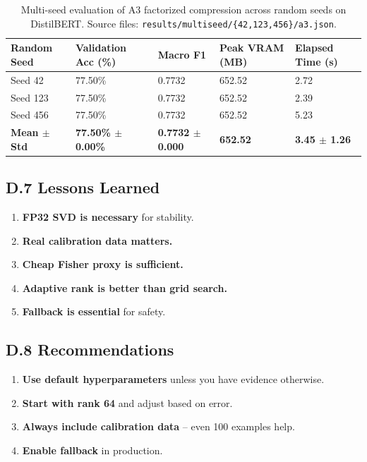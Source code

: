 \begin{table}[H]
\centering
\small
\begin{tabular}{lllll}
\toprule
\textbf{Random Seed} & \textbf{Validation Acc (\%)} & \textbf{Macro F1} & \textbf{Peak VRAM (MB)} & \textbf{Elapsed Time (s)} \\
\midrule
Seed 42  & 77.50\% & 0.7732 & 652.52 & 2.72 \\
Seed 123 & 77.50\% & 0.7732 & 652.52 & 2.39 \\
Seed 456 & 77.50\% & 0.7732 & 652.52 & 5.23 \\
\midrule
\textbf{Mean $\pm$ Std} & \textbf{77.50\% $\pm$ 0.00\%} & \textbf{0.7732 $\pm$ 0.000} & \textbf{652.52} & \textbf{3.45 $\pm$ 1.26} \\
\bottomrule
\end{tabular}
\caption{Multi-seed evaluation of A3 factorized compression across random seeds on DistilBERT. Source files: \texttt{results/multiseed/\{42,123,456\}/a3.json}.}
\label{tab:app_multiseed_eval}
\end{table}

\subsection{D.7 Lessons Learned}

\begin{enumerate}
\item \textbf{FP32 SVD is necessary} for stability.
\item \textbf{Real calibration data matters.}
\item \textbf{Cheap Fisher proxy is sufficient.}
\item \textbf{Adaptive rank is better than grid search.}
\item \textbf{Fallback is essential} for safety.
\end{enumerate}

\subsection{D.8 Recommendations}

\begin{enumerate}
\item \textbf{Use default hyperparameters} unless you have evidence otherwise.
\item \textbf{Start with rank 64} and adjust based on error.
\item \textbf{Always include calibration data} -- even 100 examples help.
\item \textbf{Enable fallback} in production.
\end{enumerate}

